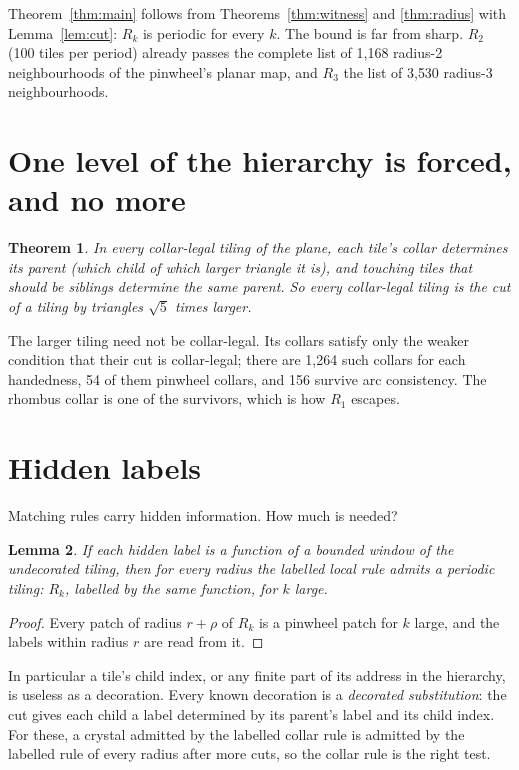 \documentclass[11pt]{article}
\newtheorem{theorem}{Theorem}
\newtheorem{lemma}[theorem]{Lemma}
\theoremstyle{definition}
\theoremstyle{remark}
\begin{document}
Theorem~\ref{thm:main} follows from Theorems~\ref{thm:witness} and
\ref{thm:radius} with Lemma~\ref{lem:cut}: $R_k$ is periodic for every $k$. The
bound is far from sharp. $R_2$ (100 tiles per period) already passes the
complete list of 1{,}168 radius-2 neighbourhoods of the pinwheel's planar map,
and $R_3$ the list of 3{,}530 radius-3 neighbourhoods.

\section{One level of the hierarchy is forced, and no more}

\begin{theorem}\label{thm:compose}
In every collar-legal tiling of the plane, each tile's collar determines its
parent (which child of which larger triangle it is), and touching tiles that
should be siblings determine the same parent. So every collar-legal tiling is
the cut of a tiling by triangles $\sqrt5$ times larger.
\end{theorem}

The larger tiling need not be collar-legal. Its collars satisfy only the weaker
condition that their cut is collar-legal; there are 1{,}264 such collars for
each handedness, 54 of them pinwheel collars, and 156 survive arc consistency.
The rhombus collar is one of the survivors, which is how $R_1$ escapes.

\section{Hidden labels}

Matching rules carry hidden information. How much is needed?

\begin{lemma}\label{lem:local}
If each hidden label is a function of a bounded window of the undecorated
tiling, then for every radius the labelled local rule admits a periodic tiling:
$R_k$, labelled by the same function, for $k$ large.
\end{lemma}

\begin{proof}
Every patch of radius $r+\rho$ of $R_k$ is a pinwheel patch for $k$ large, and
the labels within radius $r$ are read from it.
\end{proof}

In particular a tile's child index, or any finite part of its address in the
hierarchy, is useless as a decoration. Every known decoration is a
\emph{decorated substitution}: the cut gives each child a label determined by
its parent's label and its child index. For these, a crystal admitted by the
labelled collar rule is admitted by the labelled rule of every radius after
more cuts, so the collar rule is the right test.
\end{document}
